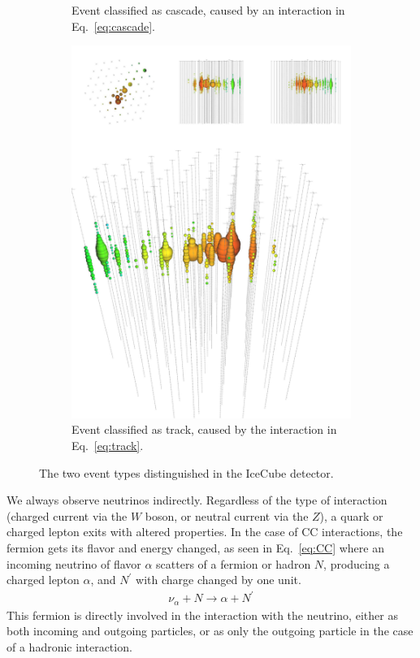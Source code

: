 \begin{figure}
\begin{center}
\begin{subfigure}{0.49\textwidth}
            \caption{Event classified as cascade, caused by an interaction in Eq.~\ref{eq:cascade}.}  
            \label{fig:events_cascade}
          \end{subfigure}
        \begin{subfigure}{0.49\textwidth}
            \centering
            \includegraphics[clip, trim=0cm 0cm 0cm 30cm, width=1\textwidth]{figures/track_event.pdf}
            \caption{Event classified as track, caused by the interaction in Eq.~\ref{eq:track}.} 
            \label{fig:events_track}
        \end{subfigure}
        \caption{The two event types distinguished in the IceCube detector.}
    \end{center}
\end{figure}
We always observe neutrinos indirectly.
Regardless of the type of interaction (charged current via the $W$ boson, or neutral current
via the $Z$), a quark or charged lepton exits with altered properties. In the case of CC interactions, the fermion
gets its flavor and energy changed, as seen in Eq.~\ref{eq:CC} where an 
incoming neutrino of flavor $\alpha$ scatters of a fermion or hadron $N$, producing a charged lepton $\alpha$,
and $N^\prime$ with charge changed by one unit. 
\begin{align}\label{eq:CC}
    \nu_\alpha + N \to \alpha + N^\prime
\end{align}
This fermion is directly involved in the interaction with the neutrino, either as 
both incoming and outgoing particles, or as only the outgoing particle in the case of a hadronic interaction.

